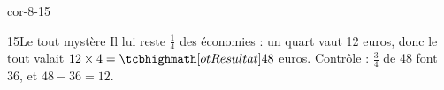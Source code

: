 \begin{blocLivre}{cor-8-15}\begin{corrige}{15}{Le tout mystère}
Il lui reste $\frac14$ des économies : un quart vaut 12 euros, donc le tout valait $12\times4=\res{48}$ euros. Contrôle : $\frac34$ de 48 font 36, et $48-36=12$.
\end{corrige}\end{blocLivre}
